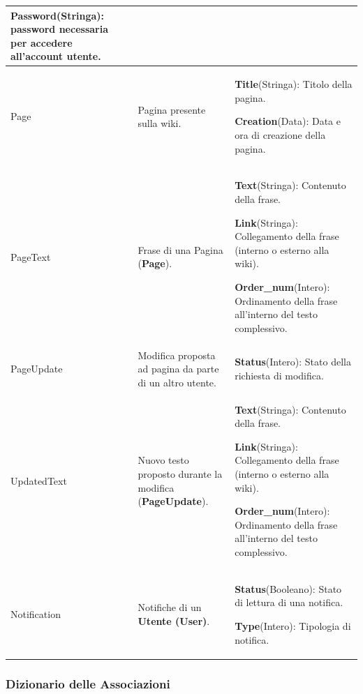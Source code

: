 \documentclass{article}
\begin{document}
{\begin{table}[H]
\begin{tabularx}{\textwidth}{|l|X|X|}
				\textbf{Password}(Stringa): password necessaria
				per accedere all’account utente. \\
				\hline
				Page & Pagina presente sulla wiki. & 
				\textbf{Title}(Stringa): Titolo della pagina.
				
				\textbf{Creation}(Data): Data e ora di creazione della pagina.
				\\
				\hline
				PageText & Frase di una Pagina (\textbf{Page}). &
				\textbf{Text}(Stringa): Contenuto della frase.
				
				\textbf{Link}(Stringa): Collegamento della frase (interno o esterno alla wiki).
				
				\textbf{Order\_num}(Intero): Ordinamento della frase all'interno del testo complessivo.
				\\
				\hline
				PageUpdate & Modifica proposta ad pagina da parte di un altro utente. & 
				\textbf{Status}(Intero): Stato della richiesta di modifica.
				\\
				\hline
				UpdatedText & Nuovo testo proposto durante la modifica (\textbf{PageUpdate}). & 
				\textbf{Text}(Stringa): Contenuto della frase.
				
				\textbf{Link}(Stringa): Collegamento della frase (interno o esterno alla wiki).
				
				\textbf{Order\_num}(Intero): Ordinamento della frase all'interno del testo complessivo.
				\\
				\hline
				Notification & Notifiche di un \textbf{Utente (User)}.& 
				\textbf{Status}(Booleano): Stato di lettura di una notifica.
				
				\textbf{Type}(Intero): Tipologia di notifica.
				\\
				\hline
				
			\end{tabularx}
			
		\end{table}
		
		{\subsubsection{Dizionario delle Associazioni}}
		
		\begin{table}[H]
			\centering
			\small %
			\setlength{\tabcolsep}{6pt} %
			\renewcommand{\arraystretch}{1.2} %
			

\end{table}}
\end{document}
